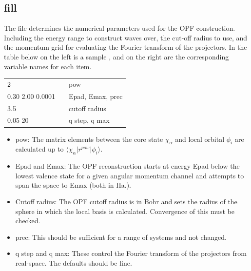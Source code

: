 \documentclass[11pt]{report}
\begin{document}
\subsection{fill}
\label{fill}
The  file determines the numerical parameters used for the OPF construction. Including the energy range to construct waves over,
the cut-off radius to use, and the momentum grid for evaluating the Fourier transform of the projectors. 
In the table below on the left is a sample , and on the right are the corresponding variable names for each item.

\begin{center}
\begin{tabular}{| l | c l |}
\hline
2						& &  pow \\
0.30 2.00 0.0001		& & Epad, Emax, prec \\
3.5 					& & cutoff radius \\
0.05 20					& & q step, q max \\
\hline
\end{tabular}
\end{center}

\begin{itemize}
\item pow: The matrix elements between the core state $\chi_\alpha$ and local orbital $\phi_i$ are calculated
 up to $\langle \chi_\alpha \vert r^{pow} \vert \phi_i \rangle$. 
\item Epad and Emax: The OPF reconstruction starts at energy Epad below the lowest valence state for a given angular momentum channel and attempts to span the space to Emax (both in Ha.). 
\item Cutoff radius: The OPF cutoff radius is in Bohr and sets the radius of the sphere in which the local basis is calculated. Convergence of this must be checked. 
\item prec: This should be sufficient for a range of systems and not changed.
\item q step and q max: These control the Fourier transform of the projectors from real-space. The defaults should be fine.
\end{itemize}


\end{document}
